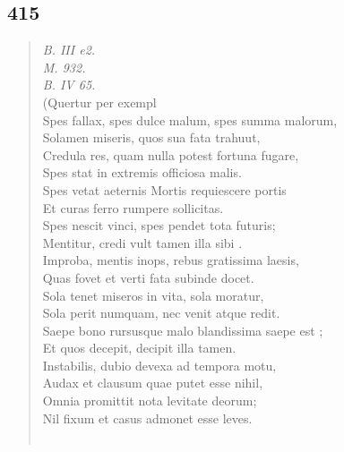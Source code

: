 \documentclass[11pt, a4paper]{report}
\begin{document}
            \subsection*{415}
      \begin{verse}
      \textit{B. III e2.} \\ \textit{M. 932.} \\ \textit{B. IV 65.} \\ (Quertur per exempl \\ Spes fallax, spes dulce malum, spes summa malorum, \\ Solamen miseris, quos sua fata trahuut, \\ Credula res, quam nulla potest fortuna fugare, \\ Spes stat in extremis officiosa malis. \\ Spes vetat aeternis Mortis requiescere portis \\ Et curas ferro rumpere sollicitas. \\ Spes nescit vinci, spes pendet tota futuris; \\ Mentitur, credi vult tamen illa  \lbrack sibi \rbrack . \\ Improba, mentis inops, rebus gratissima laesis, \\ Quas fovet et verti fata subinde docet. \\ Sola tenet miseros in vita, sola moratur, \\ Sola perit numquam, nec venit atque redit. \\ Saepe bono rursusque malo blandissima saepe  \lbrack est \rbrack ; \\ Et quos decepit, decipit illa tamen. \\ Instabilis, dubio devexa ad tempora motu, \\ Audax et clausum quae putet esse nihil, \\ Omnia promittit nota levitate deorum; \\ Nil fixum et casus admonet esse leves. \\ 
        ﻿\pagebreak 

\end{verse}
\end{document}

